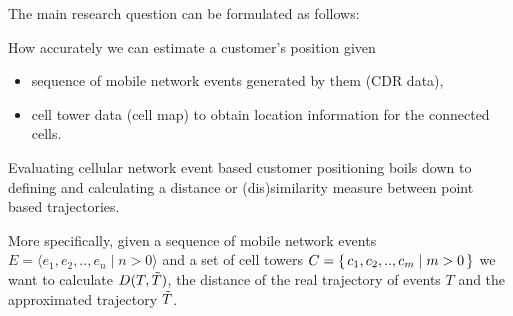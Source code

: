 The main research question can be formulated as follows:

How accurately we can estimate a customer's position given
\begin{itemize}
    \item sequence of mobile network events generated by them (CDR data),
    \item cell tower data (cell map) to obtain location information for the connected cells.
\end{itemize}

Evaluating cellular network event based customer positioning boils down to defining and calculating a distance or (dis)similarity measure between point based trajectories.

More specifically, given a sequence of mobile network events $E = \langle e_{1}, e_{2}, .., e_{n} \mid n > 0 \rangle$ and a set of cell towers $C = \set{c_{1}, c_{2}, .., c_{m} \mid m > 0}$ we want to calculate $D(T,\Tilde{T})$, the distance of the real trajectory of events $T$ and the approximated trajectory $\Tilde{T}$.

\printnomenclature





